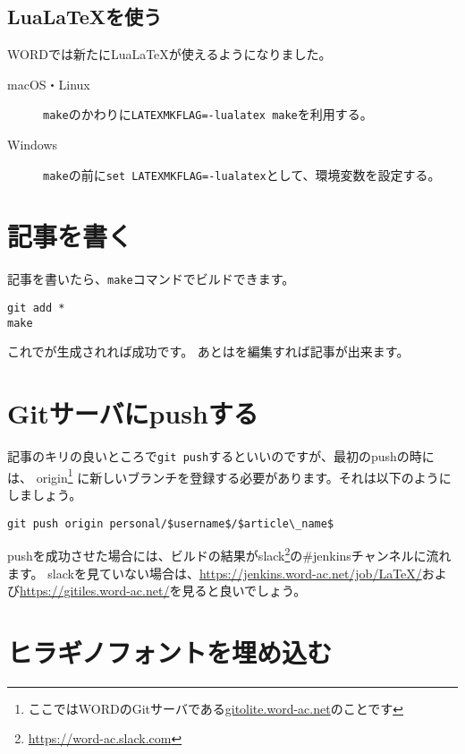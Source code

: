 \subsection{Lua\LaTeX を使う}

WORDでは新たにLua\LaTeX が使えるようになりました。

\begin{description}
  \item[macOS・Linux] \lstinline|make|のかわりに\lstinline|LATEXMKFLAG=-lualatex make|を利用する。
 
  \item[Windows] \lstinline|make|の前に\lstinline|set LATEXMKFLAG=-lualatex|として、環境変数を設定する。
\end{description}

\section{記事を書く}

記事を書いたら、\lstinline|make|コマンドでビルドできます。

\begin{lstlisting}
git add *
make
\end{lstlisting}

これでが生成されれば成功です。
あとはを編集すれば記事が出来ます。

\section{Gitサーバにpushする}

記事のキリの良いところで\lstinline|git push|するといいのですが、最初のpushの時には、
origin\footnote{ここではWORDのGitサーバである\url{gitolite.word-ac.net}のことです}%
に新しいブランチを登録する必要があります。それは以下のようにしましょう。

\begin{lstlisting}[mathescape]
git push origin personal/$username$/$article\_name$
\end{lstlisting}

pushを成功させた場合には、ビルドの結果がslack\footnote{\url{https://word-ac.slack.com}}の\#jenkinsチャンネルに流れます。
slackを見ていない場合は、\url{https://jenkins.word-ac.net/job/LaTeX/}および\url{https://gitiles.word-ac.net/}を見ると良いでしょう。

\section{ヒラギノフォントを埋め込む}

